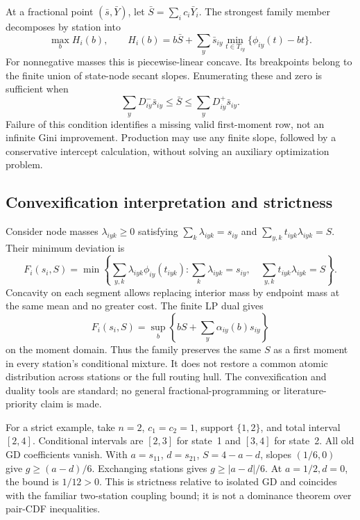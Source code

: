 At a fractional point $(\bar s,\bar Y)$, let $\bar S=\sum_i c_i\bar Y_i$.
The strongest family member decomposes by station into
\[
 \max_b H_i(b),\qquad
 H_i(b)=b\bar S+\sum_y\bar s_{iy}
       \min_{t\in T_{iy}}\{\phi_{iy}(t)-bt\}.
\]
For nonnegative masses this is piecewise-linear concave. Its breakpoints
belong to the finite union of state-node secant slopes. Enumerating these
and zero is sufficient when
\begin{equation}
 \sum_yD^-_{iy}\bar s_{iy}\le\bar S
       \le\sum_yD^+_{iy}\bar s_{iy}.
 \label{eq:shared-S-moment}
\end{equation}
Failure of this condition identifies a missing valid first-moment row,
not an infinite Gini improvement. Production may use any finite slope,
followed by a conservative intercept calculation, without solving an
auxiliary optimization problem.

\subsection{Convexification interpretation and strictness}
Consider node masses $\lambda_{iyk}\ge0$ satisfying
$\sum_k\lambda_{iyk}=s_{iy}$ and
$\sum_{y,k}t_{iyk}\lambda_{iyk}=S$. Their minimum deviation is
\[
 F_i(s_i,S)=\min\left\{
  \sum_{y,k}\lambda_{iyk}\phi_{iy}(t_{iyk}):
  \sum_k\lambda_{iyk}=s_{iy},\quad
  \sum_{y,k}t_{iyk}\lambda_{iyk}=S\right\}.
\]
Concavity on each segment allows replacing interior mass by endpoint
mass at the same mean and no greater cost. The finite LP dual gives
\[
 F_i(s_i,S)=\sup_b\left\{bS+\sum_y\alpha_{iy}(b)s_{iy}\right\}
\]
on the moment domain. Thus the family preserves the same $S$ as a first
moment in every station's conditional mixture. It does not restore a
common atomic distribution across stations or the full routing hull.
The convexification and duality tools are standard; no general
fractional-programming or literature-priority claim is made.

For a strict example, take $n=2$, $c_1=c_2=1$, support $\{1,2\}$, and total
interval $[2,4]$. Conditional intervals are $[2,3]$ for state~1 and $[3,4]$
for state~2. All old GD coefficients vanish. With $a=s_{11}$, $d=s_{21}$,
$S=4-a-d$, slopes $(1/6,0)$ give $g\ge(a-d)/6$. Exchanging stations gives
$g\ge|a-d|/6$. At $a=1/2,d=0$, the bound is $1/12>0$. This is strictness
relative to isolated GD and coincides with the familiar two-station
coupling bound; it is not a dominance theorem over pair-CDF inequalities.

